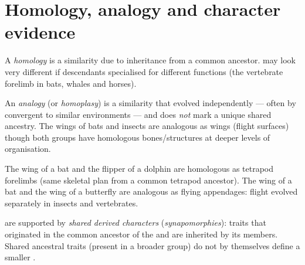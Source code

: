 \section{Homology, analogy and character evidence}

\begin{definition}[Homology]\label{def:g12:phylogeny-macroevolution:homology}
A \emph{homology} is a similarity due to inheritance
from a common ancestor.  may look very different
if descendants specialised for different functions (the vertebrate
forelimb in bats, whales and horses).
\end{definition}

\begin{definition}\label{def:g12:phylogeny-macroevolution:analogy}
An \emph{analogy} (or \emph{homoplasy})
is a similarity that evolved independently --- often by convergent
 to similar environments --- and does \emph{not} mark a unique
shared ancestry. The wings of bats and insects are analogous as wings
(flight surfaces) though both groups have homologous bones/structures
at deeper levels of organisation.
\end{definition}

\begin{example}\label{ex:g12:phylogeny-macroevolution:wings}
The wing of a bat and the flipper of a dolphin are homologous as
tetrapod forelimbs (same skeletal plan from a common tetrapod ancestor).
The wing of a bat and the wing of a butterfly are analogous as flying
appendages: flight evolved separately in insects and vertebrates.
\end{example}

\begin{proposition}\label{prop:g12:phylogeny-macroevolution:synapomorphy}
 are supported by \emph{shared derived
characters} (\emph{synapomorphies}):
traits that originated in the common ancestor of the  and are
inherited by its members. Shared ancestral traits (present in a broader
group) do not by themselves define a smaller .
\end{proposition}
\admitted


